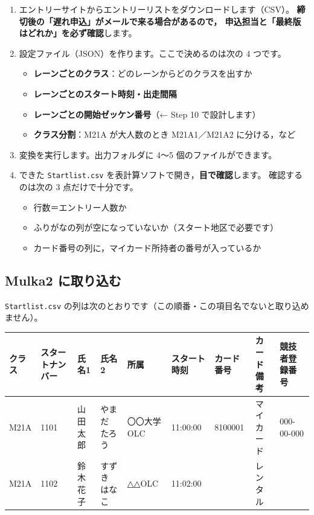 \begin{enumerate}
\item エントリーサイトからエントリーリストをダウンロードします（CSV）。
      \textbf{締切後の「遅れ申込」がメールで来る場合があるので，
      申込担当と「最終版はどれか」を必ず確認}します。
\item 設定ファイル（JSON）を作ります。ここで決めるのは次の 4 つです。
  \begin{itemize}
  \item \textbf{レーンごとのクラス}：どのレーンからどのクラスを出すか
  \item \textbf{レーンごとのスタート時刻・出走間隔}
  \item \textbf{レーンごとの開始ゼッケン番号}（← Step 10 で設計します）
  \item \textbf{クラス分割}：M21A が大人数のとき M21A1／M21A2 に分ける，など
  \end{itemize}
\item 変換を実行します。出力フォルダに 4〜5 個のファイルができます。
\item できた \texttt{Startlist.csv} を表計算ソフトで開き，\textbf{目で確認}します。
      確認するのは次の 3 点だけで十分です。
  \begin{itemize}
  \item 行数＝エントリー人数か
  \item ふりがなの列が空になっていないか（スタート地区で必要です）
  \item カード番号の列に，マイカード所持者の番号が入っているか
  \end{itemize}
\end{enumerate}

\subsection*{Mulka2 に取り込む}

\texttt{Startlist.csv} の列は次のとおりです（この順番・この項目名でないと取り込めません）。

\begin{center}
\small
\begin{tabular}{@{}lllllllll@{}}
\toprule
クラス & スタートナンバー & 氏名1 & 氏名2 & 所属 & スタート時刻 & カード番号 & カード備考 & 競技者登録番号 \\
\midrule
M21A & 1101 & 山田 太郎 & やまだ たろう & 〇〇大学OLC & 11:00:00 & 8100001 & マイカード & 000-00-000 \\
M21A & 1102 & 鈴木 花子 & すずき はなこ & △△OLC & 11:02:00 & & レンタル & \\
\bottomrule
\end{tabular}
\end{center}

